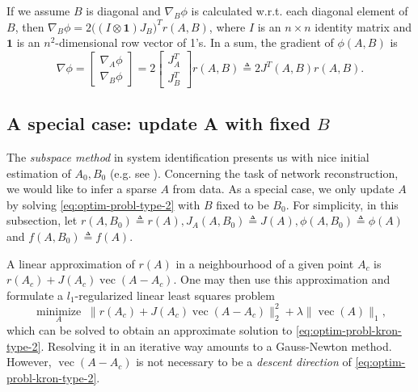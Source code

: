 \documentclass[letterpaper,10pt,journal,final]{IEEEtran}
\theoremstyle{definition}
\theoremstyle{remark}
\newcommand{\kvec}{\operatorname{vec}}
\newcommand{\minimize}[1]{\underset{#1}{\operatorname{minimize}}}  \newcommand{\st}{\operatorname{subject\ to}}
\begin{document}
If we assume $B$ is diagonal and $\nabla_B\phi$ is calculated w.r.t. each diagonal
element of $B$, then $\nabla_B\phi = 2 \big((I \otimes \mathbf{1})J_B\big)^T r(A,B)$,
where $I$ is an $n \!\times\! n$ identity matrix and $\mathbf{1}$ is an
$n^2$-dimensional row vector of 1's.  In a sum, the gradient of $\phi(A,B)$ is
\begin{equation}
  \label{eq:gradient-phi}
  \nabla \phi =
  \begin{bmatrix}
    \nabla_A \phi \\ \nabla_B \phi
  \end{bmatrix}
  = 2
  \begin{bmatrix}
    J_A^T \\ J_B^T
  \end{bmatrix} r(A,B)
  \triangleq 2 J^T(A,B) r(A,B).
\end{equation}




\subsection{A special case: update A with fixed $B$}
\label{subsec:special-case:-update-A}

The \emph{subspace method} in system identification presents us with nice
initial estimation of $A_0, B_0$ (e.g. see \cite{Viberg2002}). Concerning the
task of network reconstruction, we would like to infer a sparse $A$ from
data. As a special case, we only update $A$ by solving
\eqref{eq:optim-probl-type-2} with $B$ fixed to be $B_0$. For simplicity, in
this subsection, let
$r(A, B_0) \triangleq r(A), J_A(A, B_0) \triangleq J(A), \phi(A, B_0) \triangleq
\phi(A)$ and $f(A,B_0) \triangleq f(A)$.

A linear approximation of $r(A)$ in a neighbourhood of a given point $A_c$ is
\begin{math}
r(A_c) + J(A_c)\kvec(A - A_c).
\end{math}
One may then use this approximation and formulate a $l_1$-regularized linear least squares problem
\begin{equation}
  \label{eq:lsq-approx-opti-probl-incomplete}
  \minimize{A}\; \|r(A_c) + J(A_c) \kvec(A - A_c)\|_2^2 + \lambda \|\kvec(A)\|_1,
\end{equation}
which can be solved to obtain an approximate solution to \eqref{eq:optim-probl-kron-type-2}.
Resolving it in an iterative way amounts to a Gauss-Newton method. However, \(\kvec(A - A_c)\) is not necessary to be a \emph{descent direction} of \eqref{eq:optim-probl-kron-type-2}.
\end{document}
